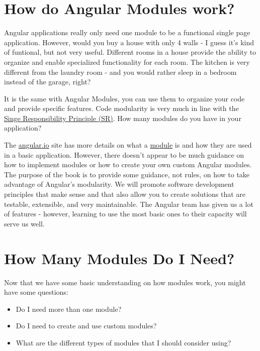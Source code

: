 \documentclass[]{book}
\providecommand{\tightlist}{%
  \setlength{\itemsep}{0pt}\setlength{\parskip}{0pt}}
\theoremstyle{definition}
\theoremstyle{definition}
\theoremstyle{definition}
\theoremstyle{remark}
\begin{document}
\section{How do Angular Modules
work?}\label{how-do-angular-modules-work}

Angular applications really only need one module to be a functional
single page application. However, would you buy a house with only 4
walls - I guess it's kind of funtional, but not very useful. Different
rooms in a house provide the ability to organize and enable specialized
functionality for each room. The kitchen is very different from the
laundry room - and you would rather sleep in a bedroom instead of the
garage, right?

It is the same with Angular Modules, you can use them to organize your
code and provide specific features. Code modularity is very much in line
with the
\href{https://en.wikipedia.org/wiki/Single_responsibility_principle}{Singe
Responsibility Principle (SR)}. How many modules do you have in your
application?

The \href{https://angular.io/guide/ngmodule}{angular.io} site has more
details on what a \href{https://angular.io/api/core/NgModule}{module} is
and how they are used in a basic application. However, there doesn't
appear to be much guidance on how to implement modules or how to create
your own custom Angular modules. The purpose of the book is to provide
some guidance, not rules, on how to take advantage of Angular's
modularity. We will promote software development principles that make
sense and that also allow you to create solutions that are testable,
extensible, and very maintainable. The Angular team has given us a lot
of features - however, learning to use the most basic ones to their
capacity will serve us well.

\section{How Many Modules Do I Need?}\label{how-many-modules-do-i-need}

Now that we have some basic understanding on how modules work, you might
have some questions:

\begin{itemize}
\tightlist
\item
  Do I need more than one module?
\item
  Do I need to create and use custom modules?
\item
  What are the different types of modules that I should consider using?
\end{itemize}
\end{document}
